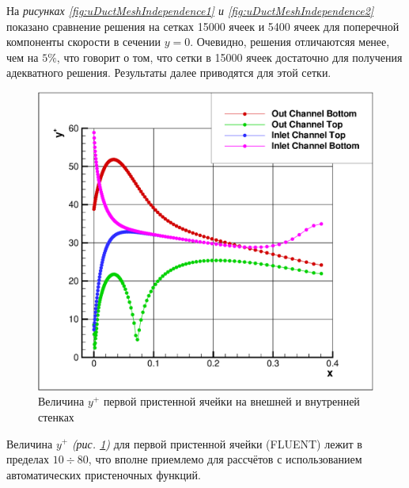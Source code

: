 На \textit{рисунках \ref{fig:uDuctMeshIndependence1} и \ref{fig:uDuctMeshIndependence2}} показано сравнение решения на сетках 15000 ячеек и 5400 ячеек для поперечной компоненты скорости в сечении $y=0$. Очевидно, решения отличаютсяя менее, чем на $5\%$, что говорит о том, что сетки в 15000 ячеек достаточно для получения адекватного решения. Результаты далее приводятся для этой сетки.

\begin{figure}[h]
	\centering
	\includegraphics[scale=0.4]{uDuctyplus}
	\caption{Величина $y^{+}$ первой пристенной ячейки на внешней и внутренней стенках}
	\label{fig:uDuctyplus}
\end{figure}
	
Величина $y^{+}$ \textit{(рис. \ref{fig:uDuctyplus})} для первой пристенной ячейки (FLUENT) лежит в пределах $10 \div 80$, что вполне приемлемо для рассчётов с использованием автоматических пристеночных функций.